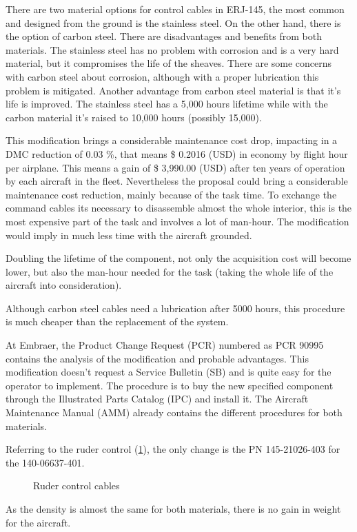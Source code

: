 There are two material options for control cables in ERJ-145, the most common and designed from the ground is the stainless steel. On the other hand, there is the option of carbon steel.
There are disadvantages and benefits from both materials. The stainless steel has no problem with corrosion and is a very hard material, but it compromises the life of the sheaves. There are some concerns with carbon steel about corrosion, although with a proper lubrication this problem is mitigated.
Another advantage from carbon steel material is that it's life is improved. The stainless steel has a 5,000 hours lifetime while with the carbon material it's raised to 10,000 hours (possibly 15,000).

This modification brings a considerable maintenance cost drop, impacting in a DMC reduction of 0.03 \%, that means \$ 0.2016 (USD) in economy by flight hour per airplane. This means a gain of \$ 3,990.00 (USD) after ten years of operation by each aircraft in the fleet. Nevertheless the proposal could bring a considerable maintenance cost reduction, mainly because of the task time. To exchange the command cables its necessary to disassemble almost the whole interior, this is the most expensive part of the task and involves a lot of man-hour. The modification would imply in much less time with the aircraft grounded.

Doubling the lifetime of the component, not only the acquisition cost will become lower, but also the man-hour needed for the task (taking the whole life of the aircraft into consideration).

Although carbon steel cables need a lubrication after 5000 hours, this procedure is much cheaper than the replacement of the system.

At Embraer, the Product Change Request (PCR) numbered as PCR 90995 contains the analysis of the modification and probable advantages. This modification doesn't request a Service Bulletin (SB) and is quite easy for the operator to implement. The procedure is to buy the new specified component through the Illustrated Parts Catalog (IPC) and install it. The Aircraft Maintenance Manual (AMM) already contains the different procedures for both materials.

Referring to the ruder control (\ref{fig:RCC}), the only change is the PN 145-21026-403 for the 140-06637-401.

\begin{figure}[H] %
\caption{Ruder control cables}
\label{fig:RCC}
\end{figure}

As the density is almost the same for both materials, there is no gain in weight for the aircraft.
